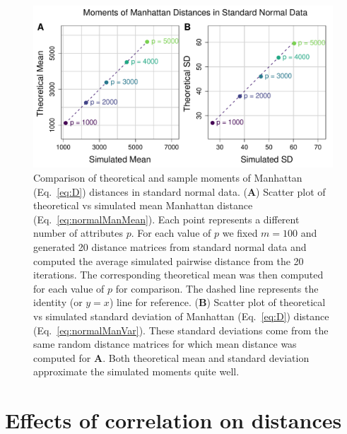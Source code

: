 \documentclass[aoas]{imsart}
\begin{document}
\begin{figure}[H]
	\centering
	\includegraphics[scale = 0.4]{compared_moments_normal_manhattan5.pdf}
	\caption{Comparison of theoretical and sample moments of Manhattan (Eq.~\ref{eq:D}) distances in standard normal data. (\textbf{A}) Scatter plot of theoretical vs simulated mean Manhattan distance (Eq.~\ref{eq:normalManMean}). Each point represents a different number of attributes $p$. For each value of $p$ we fixed $m=100$ and generated 20 distance matrices from standard normal data and computed the average simulated pairwise distance from the 20 iterations. The corresponding theoretical mean was then computed for each value of $p$ for comparison. The dashed line represents the identity (or $y=x$) line for reference. (\textbf{B}) Scatter plot of theoretical vs simulated standard deviation of Manhattan (Eq.~\ref{eq:D}) distance (Eq.~\ref{eq:normalManVar}). These standard deviations come from the same random distance matrices for which mean distance was computed for \textbf{A}. Both theoretical mean and standard deviation approximate the simulated moments quite well.}\label{fig:compare_theoretical_sample_moments}
\end{figure}

\section{Effects of correlation on distances}\label{sec:correlation}
\end{document}
